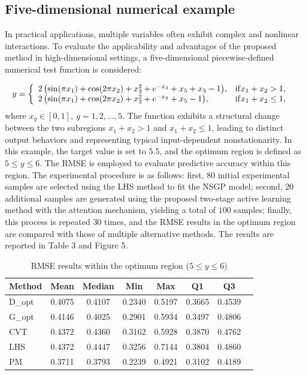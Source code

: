 \documentclass[]{interact}
\theoremstyle{plain}%
\theoremstyle{definition}
\theoremstyle{remark}
\begin{document}
\subsection{Five-dimensional numerical example}
In practical applications, multiple variables often exhibit complex and nonlinear interactions. To evaluate the applicability and advantages of the proposed method in high-dimensional settings, a five-dimensional piecewise-defined numerical test function is considered:

\begin{equation}
	y = \left\{ {\begin{array}{*{20}{l}}
			{2\left( {\sin (\pi {x_1}) + \cos (2\pi {x_2}) + x_3^2 + {e^{ - {x_4}}} + {x_5} + {x_3} - 1} \right)},&{{\rm{if }}{x_1} + {x_2} > 1,}&{}\\
			{2\left( {\sin (\pi {x_1}) + \cos (2\pi {x_2}) + x_3^2 + {e^{ - {x_4}}} + {x_5} - 1} \right)},&{{\rm{if }}{x_1} + {x_2} \le 1},&{}
	\end{array}} \right.
\end{equation}
where $x_g \in [0, 1],\ g = 1, 2, \ldots, 5$.  The function exhibits a structural change between the two subregions $x_{1} + x_{2} > 1$ and $x_{1} + x_{2} \le 1$, leading to distinct output behaviors and representing typical input-dependent nonstationarity. In this example, the target value is set to $5.5$, and the optimum region is defined as $5 \le y \le 6$. The RMSE is employed to evaluate predictive accuracy within this region. The experimental procedure is as follows: first, $80$ initial experimental samples are selected using the LHS method to fit the NSGP model; second, $20$ additional samples are generated using the proposed two-stage active learning method with the attention mechanism, yielding a total of $100$ samples; finally, this process is repeated $30$ times, and the RMSE results in the optimum region are compared with those of multiple alternative methods. The results are reported in Table 3 and Figure 5.

\begin{table}[h]
	\centering
	\caption{RMSE results within the optimum region ($5 \le y \le 6$)}
	\label{tab:rmse_optimum_region}
		\begin{tabular}{lccccccc}
			\toprule
			Method & Mean & Median & Min & Max & Q1 & Q3 \\
			\midrule
			D\_opt & 0.4075 & 0.4107 & 0.2340 & 0.5197 & 0.3665 & 0.4539 \\
			G\_opt & 0.4146 & 0.4025 & 0.2901 & 0.5934 & 0.3497 & 0.4806 \\
			CVT    & 0.4372 & 0.4360 & 0.3162 & 0.5928 & 0.3870 & 0.4762 \\
			LHS    & 0.4372 & 0.4447 & 0.3256 & 0.7144 & 0.3804 & 0.4860 \\
			PM     & 0.3711 & 0.3793 & 0.2239 & 0.4921 & 0.3102 & 0.4189 \\
			\bottomrule
		\end{tabular}%
\end{table}
\end{document}
